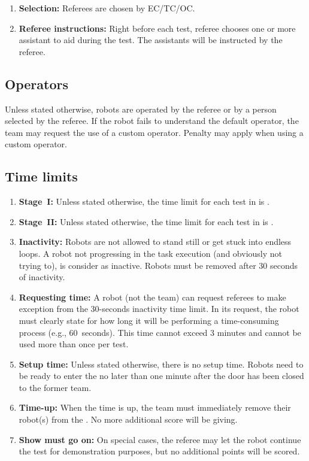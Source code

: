\begin{enumerate}
	\item \textbf{Selection:} Referees are chosen by EC/TC/OC.

	\item \textbf{Referee instructions:} Right before each test, referee chooses one or more assistant to aid during the test. The assistants will be instructed by the referee.
\end{enumerate}


\subsection{Operators}
\label{rule:operator}
Unless stated otherwise, robots are operated by the referee or by a person selected by the referee.
If the robot fails to understand the default operator, the team may request the use of a custom operator.
Penalty may apply when using a custom operator.


\subsection{Time limits}
\label{rule:time_limits}
\begin{enumerate}
	\item \textbf{Stage~I:} Unless stated otherwise, the time limit for each test in  is .

	\item \textbf{Stage~II:} Unless stated otherwise, the time limit for each test in  is .

	\item \textbf{Inactivity:} Robots are not allowed to stand still or get stuck into endless loops.
	A robot not progressing in the task execution (and obviously not trying to), is consider as inactive.
	Robots must be removed after 30 seconds of inactivity.

	\item \textbf{Requesting time:} A robot (not the team) can request referees to make exception from the 30-seconds inactivity time limit.
	In its request, the robot must clearly state for how long it will be performing a time-consuming process (e.g., 60~seconds).
	This time cannot exceed 3 minutes and cannot be used more than once per test.

	\item \textbf{Setup time:} Unless stated otherwise, there is no setup time.
	Robots need to be ready to enter the \Arena{} no later than one minute after the door has been closed to the former team.

	\item \textbf{Time-up:} When the time is up, the team must immediately remove their robot(s) from the  \Arena{}.
	No more additional score will be giving.

	\item \textbf{Show must go on:} On special cases, the referee may let the robot continue the test for demonstration purposes, but no additional points will be scored.
\end{enumerate}



